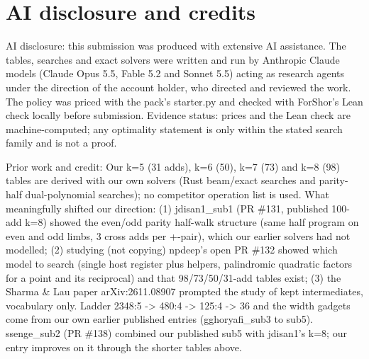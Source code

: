 \documentclass{article}
\begin{document}
\section*{AI disclosure and credits}
AI disclosure: this submission was produced with extensive AI assistance. The tables, searches and exact solvers were written and run by Anthropic Claude models (Claude Opus 5.5, Fable 5.2 and Sonnet 5.5) acting as research agents under the direction of the account holder, who directed and reviewed the work. The policy was priced with the pack's starter.py and checked with ForShor's Lean check locally before submission. Evidence status: prices and the Lean check are machine-computed; any optimality statement is only within the stated search family and is not a proof.

Prior work and credit: Our k=5 (31 adds), k=6 (50), k=7 (73) and k=8 (98) tables are derived with our own solvers (Rust beam/exact searches and parity-half dual-polynomial searches); no competitor operation list is used. What meaningfully shifted our direction: (1) jdisan1\_sub1 (PR \#131, published 100-add k=8) showed the even/odd parity half-walk structure (same half program on even and odd limbs, 3 cross adds per +-pair), which our earlier solvers had not modelled; (2) studying (not copying) npdeep's open PR \#132 showed which model to search (single host register plus helpers, palindromic quadratic factors for a point and its reciprocal) and that 98/73/50/31-add tables exist; (3) the Sharma \& Lau paper arXiv:2611.08907 prompted the study of kept intermediates, vocabulary only. Ladder 2348:5 -> 480:4 -> 125:4 -> 36 and the width gadgets come from our own earlier published entries (gghoryafi\_sub3 to sub5). ssenge\_sub2 (PR \#138) combined our published sub5 with jdisan1's k=8; our entry improves on it through the shorter tables above.
\end{document}
